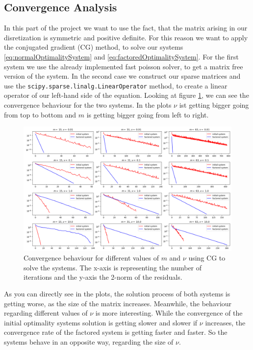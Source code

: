 \documentclass{amsart}
\theoremstyle{definition}
\theoremstyle{remark}
\numberwithin{equation}{section}
\begin{document}
\subsection{Convergence Analysis}
In this part of the project we want to use the fact, that the matrix arising in our disretization is symmetric and positive definite. For this reason we want to apply the conjugated gradient (CG) method, to solve our systems \eqref{eq:normalOptimalitySystem} and \eqref{eq:factoredOptimalitySystem}.
For the first system we use the already implemented fast poisson solver, to get a matrix free version of the system. In the second case we construct our sparse matrices and use the \texttt{scipy.sparse.linalg.LinearOperator} method, to create a linear operator of our left-hand side of the equation.
Looking at figure \ref{fig:CG-convergence}, we can see the  convergence behaviour for the two systems. In the plots $\nu$ ist getting bigger going from top to bottom and $m$ is getting bigger going from left to right.
\begin{figure}[h!]
\centering
\includegraphics[scale=0.46]{./imgs/CG_analysis}
\caption{Convergence behaviour for different values of $m$ and $\nu$ using CG to solve the systems. The x-axis is representing the number of iterations
and the y-axis the 2-norm of the residuals.}
\label{fig:CG-convergence}
\end{figure}
As you can directly see in the plots, the solution process of both systems is getting worse, as the size of the matrix increases. Meanwhile, the behaviour 
regarding different values of $\nu$ is more interesting. While the convergence of the initial optimality systems solution is getting slower and slower if 
$\nu$ increases, the convergence rate of the factored system is getting faster and faster. So the systems behave in an opposite way, regarding the size of 
$\nu$.
\end{document}
